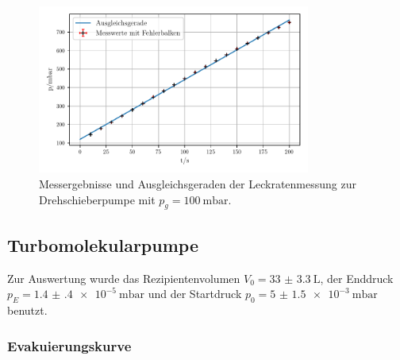     \begin{figure}
        \centering
        \includegraphics[width=0.8\textwidth]{abb/dreh_leck100.pdf}
        \caption{Messergebnisse und Ausgleichsgeraden der Leckratenmessung zur Drehschieberpumpe mit $p_g = \qty{100}{\milli\bar}$.}
        \label{fig:drehLeck100}
    \end{figure}
    
\newpage
\subsection{Turbomolekularpumpe}
    Zur Auswertung wurde das Rezipientenvolumen $V_0 = \SI{33(3.3)}{\liter}$\cite{sample}, der Enddruck $p_E = \qty{1.4(4)e-5}{\milli\bar}$
    und der Startdruck $p_0 = \qty{5(1.5)e-3}{\milli\bar}$ benutzt.

    \subsubsection{Evakuierungskurve}

